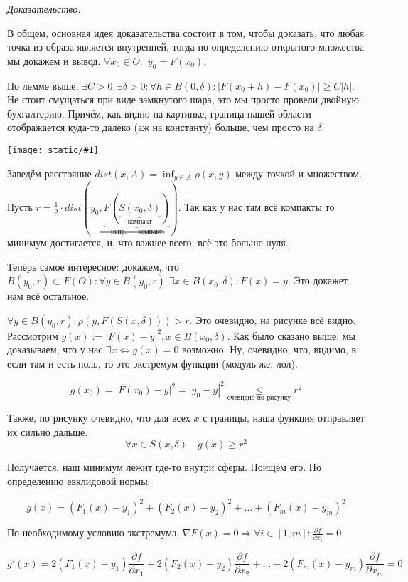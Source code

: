 \documentclass{article}
\def\dbl{\,\,}
\def\image#1{\texttt{[image: static/\#1]}}
\begin{document}
\textit{Доказательство:}

В общем, основная идея доказательства состоит в том, чтобы доказать, что любая точка из образа является внутренней, тогда по определению открытого множества мы докажем и вывод.
$\forall x_0 \in O: \dbl y_0 = F(x_0)$. 

По лемме выше, $\exists C > 0, \exists \delta > 0: \forall h \in \overline{B(0, \delta)}: |F(x_0 + h) - F(x_0)| \ge C|h|$. Не стоит смущаться при виде замкнутого шара, это мы просто провели двойную бухгалтерию. Причём, как видно на картинке, граница нашей области отображается куда-то далеко (аж на константу) больше, чем просто на $\delta$.

\image{sohr_obl_2.png}

Заведём расстояние $dist(x, A) = \inf_{y \in A} \rho(x, y)$ между точкой и множеством. Пусть $r = \frac{1}{2} \cdot dist(y_0, \underbrace{F(\underbrace{S(x_0, \delta)}_{\text{компакт}})}_{\text{непр. } \Rightarrow \text{ компакт}})$. Так как у нас там всё компакты то минимум достигается, и, что важнее всего, всё это больше нуля.

Теперь самое интересное: докажем, что $B(y_0, r) \subset F(O): \forall y \in B(y_0, r) \dbl \exists x \in B(x_0, \delta): F(x) = y$. Это докажет нам всё остальное.

$\forall y \in B(y_0, r): \rho(y, F(S(x, \delta))) > r$. Это очевидно, на рисунке всё видно. Рассмотрим $g(x) := |F(x) - y|^2, x \in B(x_0, \delta)$. Как было сказано выше, мы доказываем, что у нас $\exists x \Leftrightarrow g(x) = 0$ возможно. Ну, очевидно, что, видимо, в если там и есть ноль, то это экстремум функции (модуль же, лол).

\[g(x_0) = |F(x_0) - y|^2 = |y_0 - y|^2 \underset{\text{очевидно по рисунку}}{\le} r^2\]

Также, по рисунку очевидно, что для всех $x$ с границы, наша функция отправляет их сильно дальше.
\[\forall x \in S(x, \delta) \quad g(x) \ge r^2\]

Получается, наш минимум лежит где-то внутри сферы. Поищем его. По определению евклидовой нормы:

\[g(x) = (F_1(x) - y_1)^2 + (F_2(x) - y_2)^2 + \ldots + (F_m(x) - y_m)^2\]

По необходимому условию экстремума, $\nabla F(x) = 0 \Rightarrow \forall i \in [1, m]: \frac{\partial f}{\partial x_i} = 0$

\[g'(x) = 2(F_1(x) - y_1)\frac{\partial f}{\partial x_1} + 2(F_2(x) - y_2)\frac{\partial f}{\partial x_2} + \ldots + 2(F_m(x) - y_m)\frac{\partial f}{\partial x_m} = 0\]
\end{document}
